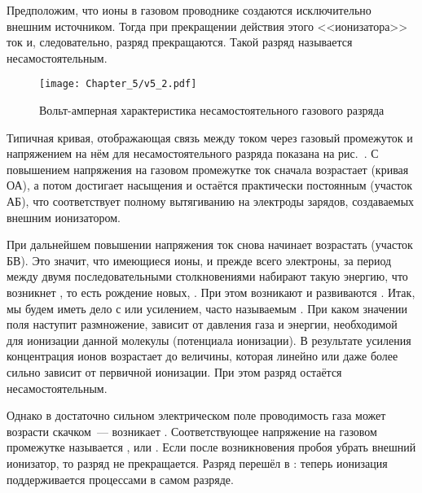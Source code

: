 Предположим, что ионы в газовом проводнике создаются исключительно внешним
источником. Тогда при прекращении действия этого <<ионизатора>> ток и,
следовательно, разряд прекращаются. Такой разряд называется несамостоятельным.

\begin{figure}[h!]
	\centering
	\texttt{[image: Chapter\_5/v5\_2.pdf]}
	\caption{Вольт-амперная характеристика несамостоятельного газового разряда}
\end{figure}

Типичная кривая, отображающая связь между током через газовый промежуток и
напряжением на нём для несамостоятельного разряда показана на
рис.~. С повышением напряжения
на газовом промежутке ток сначала возрастает (кривая ОА), а потом достигает
насыщения и остаётся практически постоянным (участок АБ), что соответствует
полному вытягиванию на электроды зарядов, создаваемых внешним ионизатором.

При дальнейшем повышении напряжения ток снова начинает возрастать (участок БВ).
Это значит, что имеющиеся ионы, и прежде всего электроны, за период между двумя
последовательными столкновениями набирают такую энергию, что возникнет
, то есть рождение новых,
. При этом возникают и развиваются
. Итак, мы будем иметь дело с
 или усилением, часто называемым . При каком значении поля наступит размножение, зависит от давления
газа и энергии, необходимой для ионизации
данной молекулы (потенциала ионизации). В результате усиления концентрация ионов
возрастает до величины, которая линейно
или даже более сильно зависит от первичной ионизации. При этом разряд остаётся
несамостоятельным.

Однако в достаточно сильном электрическом поле проводимость газа может возрасти
скачком~--- возникает .
Соответствующее напряжение на газовом промежутке называется
, или .
Если после возникновения пробоя убрать внешний ионизатор, то разряд не
прекращается. Разряд перешёл в : теперь ионизация поддерживается процессами в самом
разряде.

